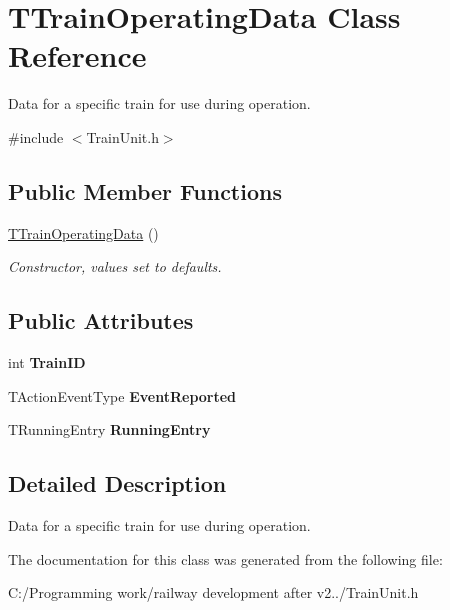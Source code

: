 \hypertarget{class_t_train_operating_data}{}\section{T\+Train\+Operating\+Data Class Reference}
\label{class_t_train_operating_data}


Data for a specific train for use during operation.  




{\ttfamily \#include $<$Train\+Unit.\+h$>$}

\subsection*{Public Member Functions}
\begin{DoxyCompactItemize}
\item 
\mbox{\label{class_t_train_operating_data_a0d7961667bbcdf20a744db7c1a2125af}} 
\mbox{\hyperlink{class_t_train_operating_data_a0d7961667bbcdf20a744db7c1a2125af}{T\+Train\+Operating\+Data}} ()
\begin{DoxyCompactList}\small\item\em Constructor, values set to defaults. \end{DoxyCompactList}\end{DoxyCompactItemize}
\subsection*{Public Attributes}
\begin{DoxyCompactItemize}
\item 
\mbox{\label{class_t_train_operating_data_aa75dba204a2655d41e74c42694e92b81}} 
int {\bfseries Train\+ID}
\item 
\mbox{\label{class_t_train_operating_data_afd7bc1b962e312062e0d27f0380e8c69}} 
T\+Action\+Event\+Type {\bfseries Event\+Reported}
\item 
\mbox{\label{class_t_train_operating_data_a9a46cddc0bed9cbbfff18b8909ae8047}} 
T\+Running\+Entry {\bfseries Running\+Entry}
\end{DoxyCompactItemize}


\subsection{Detailed Description}
Data for a specific train for use during operation. 

The documentation for this class was generated from the following file\+:\begin{DoxyCompactItemize}
\item 
C\+:/\+Programming work/railway development after v2../Train\+Unit.\+h\end{DoxyCompactItemize}

